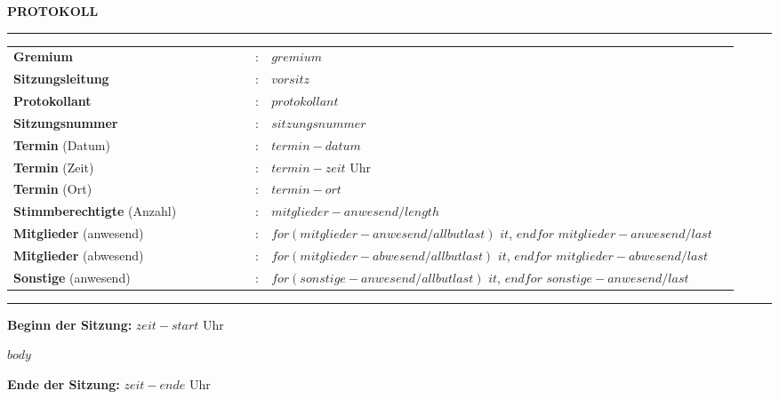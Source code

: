 \documentclass{scrartcl}
\renewcommand{\maketitle}{
    \begin{center}
        \begin{Huge}
            \textbf{PROTOKOLL}
        \end{Huge}
    \end{center}
}
\newcommand{\sessionstart}[1]{\noindent\normalfont\large\textbf{Beginn der Sitzung:} #1}
\newcommand{\sessionend}[1]{\noindent\normalfont\large\textbf{Ende der Sitzung:} #1}
\begin{document}
\thispagestyle{empty}
\maketitle
\hrule

\renewcommand{\arraystretch}{1.5}
\noindent
\begin{tabular}{p{0.32\linewidth}p{0.01\linewidth}p{0.62\linewidth}}
    \textbf{Gremium} &:& $gremium$ \\
    \textbf{Sitzungsleitung} &:& $vorsitz$ \\
    \textbf{Protokollant} &:& $protokollant$ \\
    \textbf{Sitzungsnummer} &:& $sitzungsnummer$ \\
    \textbf{Termin} (Datum)&:& $termin-datum$ \\
    \textbf{Termin} (Zeit) &:& $termin-zeit$ Uhr\\
    \textbf{Termin} (Ort) &:& $termin-ort$ \\

    \textbf{Stimmberechtigte} (Anzahl) &:&
    $mitglieder-anwesend/length$ \\

    \textbf{Mitglieder} (anwesend) &:&
    $for(mitglieder-anwesend/allbutlast)$
        $it$,
    $endfor$
    $mitglieder-anwesend/last$ \\
    

    \textbf{Mitglieder} (abwesend) &:&
    $for(mitglieder-abwesend/allbutlast)$
        $it$,
    $endfor$
    $mitglieder-abwesend/last$ \\

    \textbf{Sonstige} (anwesend) &:&
    $for(sonstige-anwesend/allbutlast)$
        $it$, 
    $endfor$
    $sonstige-anwesend/last$ \\
\end{tabular}
\hrule

\renewcommand{\contentsname}{Agenda}
\renewcommand{\baselinestretch}{1}\normalsize
\tableofcontents
\newpage

\sessionstart{$zeit-start$ Uhr}

$body$

\sessionend{$zeit-ende$ Uhr}
\end{document}
